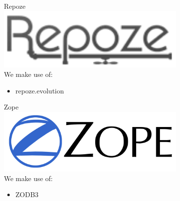 \documentclass[11pt,a4paper]{article}
\begin{document}

\vspace{1.5cm}


\hspace{0.025\linewidth}
\begin{minipage}[b]{0.45\linewidth}
  Repoze\\
  \includegraphics[width=0.7\textwidth]{graphics/repoze-logo_lo.png}\\
  We make use of:\\
  \begin{itemize}
    \item repoze.evolution
  \end{itemize}
\end{minipage}
\hspace{0.05\linewidth}
\begin{minipage}[b]{0.45\linewidth}
  Zope\\
  \includegraphics[width=0.7\textwidth]{graphics/zopeHIres.png}\\
  We make use of:\\
  \begin{itemize}
    \item ZODB3
  \end{itemize}
\end{minipage}
\end{document}
